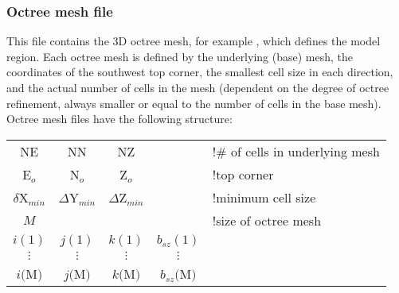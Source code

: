 \subsubsection{Octree mesh file}

This file contains the 3D octree mesh, for example , which defines the model region. Each octree mesh is defined by the underlying (base) mesh, the coordinates of the southwest top corner, the smallest cell size in each direction, and the actual number of cells in the mesh (dependent on the degree of octree refinement, always smaller or equal to the number of cells in the base mesh). Octree mesh files have the following structure:

\begin{fileExample}
\begin{tabular}{|ccccl|}
\hline
NE & NN & NZ & & !$\#$ of cells in underlying mesh\\
E$_o$ & N$_o$ & Z$_o$ & & !top corner\\
$\delta$X$_{min}$ & $\Delta$Y$_{min}$ & $\Delta$Z$_{min}$ & & !minimum cell size\\
$M$ & & & & !size of octree mesh\\
$i(1)$ & $j(1)$ & $k(1)$ & $b_{sz}(1)$ &  \\
$\vdots$ & $\vdots$ & $\vdots$ & $\vdots$ & \\
$i($M$)$ & $j($M$)$ & $k($M$)$ & $b_{sz}($M$)$ & \\
\hline
\end{tabular}
\end{fileExample}
%
